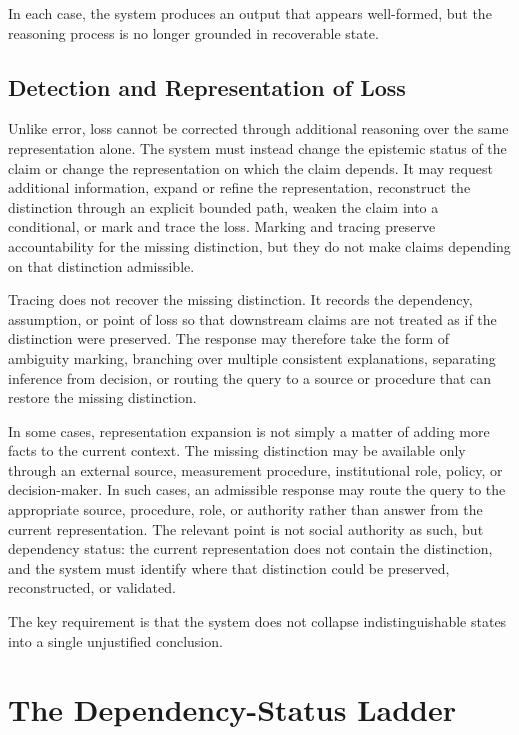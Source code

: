 \documentclass[11pt]{article}
\begin{document}
In each case, the system produces an output that appears well-formed, but the reasoning process is no longer grounded in recoverable state.

\subsection{Detection and Representation of Loss}

Unlike error, loss cannot be corrected through additional reasoning over the same representation alone. The system must instead change the epistemic status of the claim or change the representation on which the claim depends. It may request additional information, expand or refine the representation, reconstruct the distinction through an explicit bounded path, weaken the claim into a conditional, or mark and trace the loss. Marking and tracing preserve accountability for the missing distinction, but they do not make claims depending on that distinction admissible.

Tracing does not recover the missing distinction. It records the dependency, assumption, or point of loss so that downstream claims are not treated as if the distinction were preserved. The response may therefore take the form of ambiguity marking, branching over multiple consistent explanations, separating inference from decision, or routing the query to a source or procedure that can restore the missing distinction.

In some cases, representation expansion is not simply a matter of adding more facts to the current context. The missing distinction may be available only through an external source, measurement procedure, institutional role, policy, or decision-maker. In such cases, an admissible response may route the query to the appropriate source, procedure, role, or authority rather than answer from the current representation. The relevant point is not social authority as such, but dependency status: the current representation does not contain the distinction, and the system must identify where that distinction could be preserved, reconstructed, or validated.

The key requirement is that the system does not collapse indistinguishable states into a single unjustified conclusion.

\section{The Dependency-Status Ladder}
\end{document}
